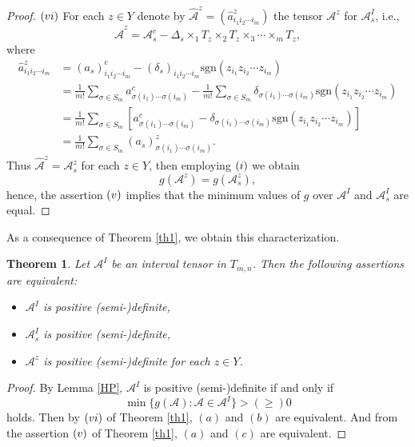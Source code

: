 \documentclass[twoside]{article}
\newtheorem{theorem}{Theorem}[section]
\begin{document}
\begin{proof}
$(\romannumeral6)$ For each $z \in Y$ denote by $\widehat{\mathcal{A}}^z=(\widehat{a}^z_{i_1i_2\cdots i_m})$ the tensor $\mathcal{A}^z$ for $ \mathcal{A}_s^I$, i.e.,
$$\widehat{\mathcal{A}}^z=\mathcal{A}_s^c-\Delta_s\times_1 T_z\times_2 T_z\times_3\cdots\times_m T_z,$$
where
\begin{align*}
\widehat{a}^z_{i_1i_2\cdots i_m}&=(a_s)^c_{i_1i_2\cdots i_m}-(\delta_s)_{i_1i_2\cdots i_m}\mbox{sgn}({z_{i_1}z_{i_2}\cdots z_{i_m}})\\
&=\frac{1}{m!}\sum_{\sigma \in S_m} a^c_{\sigma(i_1)\cdots \sigma(i_m)}-\frac{1}{m!}\sum_{\sigma \in S_m} \delta_{\sigma(i_1)\cdots \sigma(i_m)}\mbox{sgn}({z_{i_1}z_{i_2}\cdots z_{i_m}})\\
&=\frac{1}{m!}\sum_{\sigma \in S_m} [a^c_{\sigma(i_1)\cdots \sigma(i_m)}-\delta_{\sigma(i_1)\cdots \sigma(i_m)}\mbox{sgn}({z_{i_1}z_{i_2}\cdots z_{i_m}})]\\
&=\frac{1}{m!}\sum_{\sigma \in S_m} (a_s)^z_{\sigma(i_1)\cdots \sigma(i_m)}.
\end{align*}
Thus $\widehat{\mathcal{A}}^z=\mathcal{A}_s^z$ for each $z \in Y$, then employing $(\romannumeral1)$ we obtain
$$g(\mathcal{A}^z)=g(\mathcal{A}_s^z),$$
hence, the assertion $(\romannumeral5)$ implies that the minimum values of $g$ over $\mathcal{A}^I$ and $\mathcal{A}_s^I$ are equal.
\end{proof}

As a consequence of Theorem \ref{th1}, we obtain this characterization.

\begin{theorem}\label{th2}
Let $\mathcal{A}^I$ be an interval tensor in $T_{m,n}$. Then the following assertions are equivalent:
\begin{itemize}
  \item [$(a)$] $\mathcal{A}^I$ is positive (semi-)definite,
  \item [$(b)$] $\mathcal{A}^I_s$ is positive (semi-)definite,
  \item [$(c)$] $\mathcal{A}^z$ is positive (semi-)definite for each $z\in Y$.
\end{itemize}
\end{theorem}
\begin{proof} By Lemma \ref{HP}, $\mathcal{A}^I$ is positive (semi-)definite if and only if
$$\min \{g(\mathcal{A}): \mathcal{A}\in \mathcal{A}^I \} >(\geq) 0$$
holds. Then by $(\romannumeral6)$ of Theorem \ref{th1}, $(a)$ and $(b)$ are equivalent. And from the assertion $(\romannumeral5)$ of Theorem \ref{th1}, $(a)$ and $(c)$ are equivalent.
\end{proof}
\end{document}
